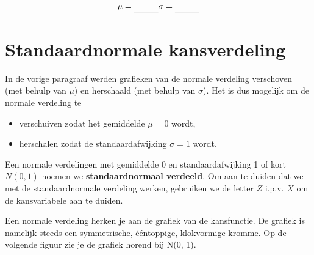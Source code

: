 \documentclass[12pt,twoside]{article}
\begin{document}
{\begin{oefening}
\begin{multicols}{2}
\begin{center}
$$\mu=\arule{1cm} \sigma=\arule{1cm}$$
\end{center}
\end{multicols}
\end{oefening}

\pagebreak
\section{Standaardnormale kansverdeling}

In de vorige paragraaf werden grafieken van de normale verdeling verschoven (met behulp van $\mu$) en herschaald (met behulp van $\sigma$). Het is dus mogelijk om de normale verdeling te
\begin{itemize}
  \item verschuiven zodat het gemiddelde $\mu=0$ wordt,
  \item herschalen zodat de standaardafwijking $\sigma=1$ wordt.
\end{itemize}

Een normale verdelingen met gemiddelde 0 en standaardafwijking 1 of kort $N(0,1)$ noemen we {\bf standaardnormaal verdeeld}. Om aan te duiden dat we met de standaardnormale verdeling werken, gebruiken we de letter $Z$ i.p.v. $X$ om de kansvariabele aan te duiden.

Een normale verdeling herken je aan de grafiek van de kansfunctie. De grafiek is namelijk steeds een symmetrische, ééntoppige, klokvormige kromme. Op de volgende figuur zie je de grafiek horend bij N(0, 1).


}
\end{document}
